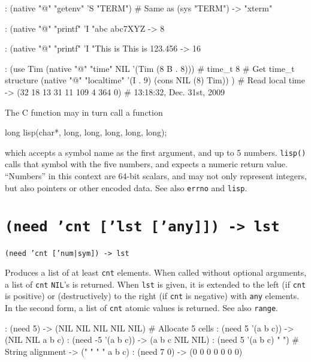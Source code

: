 \begin{wideverbatim}
: (native "@" "getenv" 'S "TERM")  # Same as (sys "TERM")
-> "xterm"

: (native "@" "printf" 'I "abc%
abc7XYZ
-> 8

: (native "@" "printf" 'I "This is %
This is 123.456
-> 16

: (use Tim
   (native "@" "time" NIL '(Tim (8 B . 8)))  # time_t 8   # Get time_t structure
   (native "@" "localtime" '(I . 9) (cons NIL (8) Tim)) ) # Read local time
-> (32 18 13 31 11 109 4 364 0)  # 13:18:32, Dec. 31st, 2009
\end{wideverbatim}

The C function may in turn call a function


\begin{wideverbatim}
long lisp(char*, long, long, long, long, long);
\end{wideverbatim}

which accepts a symbol name as the first argument, and up to 5 numbers.
\texttt{lisp()} calls that symbol with the five numbers, and expects a numeric
return value. ``Numbers'' in this context are 64-bit scalars, and may not
only represent integers, but also pointers or other encoded data. See
also \texttt{errno} and \texttt{lisp}.

 
\section*{\texttt{(need 'cnt ['lst ['any]]) -> lst}}
\label{sec:func-ref-N-(need 'cnt ['lst ['any]]) -> lst}


\texttt{(need 'cnt ['num|sym]) -> lst}

Produces a list of at least \texttt{cnt} elements. When called without optional
arguments, a list of \texttt{cnt} \texttt{NIL}'s is returned. When \texttt{lst} is given, it
is extended to the left (if \texttt{cnt} is positive) or (destructively) to the
right (if \texttt{cnt} is negative) with \texttt{any} elements. In the second form, a
list of \texttt{cnt} atomic values is returned. See also \texttt{range}.


\begin{wideverbatim}
: (need 5)
-> (NIL NIL NIL NIL NIL)  # Allocate 5 cells
: (need 5 '(a b c))
-> (NIL NIL a b c)
: (need -5 '(a b c))
-> (a b c NIL NIL)
: (need 5 '(a b c) " ")  # String alignment
-> (" " " " a b c)
: (need 7 0)
-> (0 0 0 0 0 0 0)
\end{wideverbatim}

